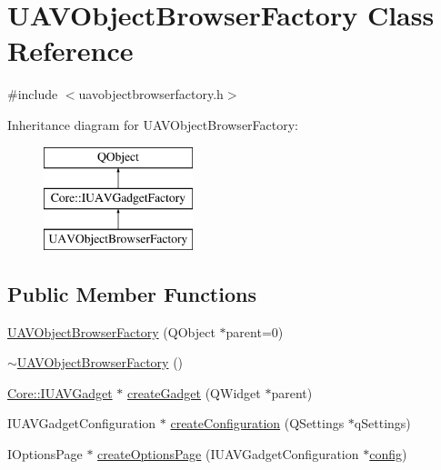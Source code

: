 \hypertarget{class_u_a_v_object_browser_factory}{\section{U\-A\-V\-Object\-Browser\-Factory Class Reference}
\label{class_u_a_v_object_browser_factory}
}


{\ttfamily \#include $<$uavobjectbrowserfactory.\-h$>$}

Inheritance diagram for U\-A\-V\-Object\-Browser\-Factory\-:\begin{figure}[H]
\begin{center}
\leavevmode
\includegraphics[height=3.000000cm]{class_u_a_v_object_browser_factory}
\end{center}
\end{figure}
\subsection*{Public Member Functions}
\begin{DoxyCompactItemize}
\item 
\hyperlink{group___u_a_v_object_browser_plugin_gaff1c7d505f0ee15281d551b8b3dce992}{U\-A\-V\-Object\-Browser\-Factory} (Q\-Object $\ast$parent=0)
\item 
\hyperlink{group___u_a_v_object_browser_plugin_ga54b418760329382fb643d6426b98f364}{$\sim$\-U\-A\-V\-Object\-Browser\-Factory} ()
\item 
\hyperlink{class_core_1_1_i_u_a_v_gadget}{Core\-::\-I\-U\-A\-V\-Gadget} $\ast$ \hyperlink{group___u_a_v_object_browser_plugin_gaed204f2a2b245f42bb13ed08a9ea5e24}{create\-Gadget} (Q\-Widget $\ast$parent)
\item 
I\-U\-A\-V\-Gadget\-Configuration $\ast$ \hyperlink{group___u_a_v_object_browser_plugin_gadb16c3cd6a17fd14fe487542e0905a47}{create\-Configuration} (Q\-Settings $\ast$q\-Settings)
\item 
I\-Options\-Page $\ast$ \hyperlink{group___u_a_v_object_browser_plugin_ga196f1eda8a78dac2c94fb6fe3f6a563d}{create\-Options\-Page} (I\-U\-A\-V\-Gadget\-Configuration $\ast$\hyperlink{deflate_8c_a4473b5227787415097004fd39f55185e}{config})
\end{DoxyCompactItemize}
